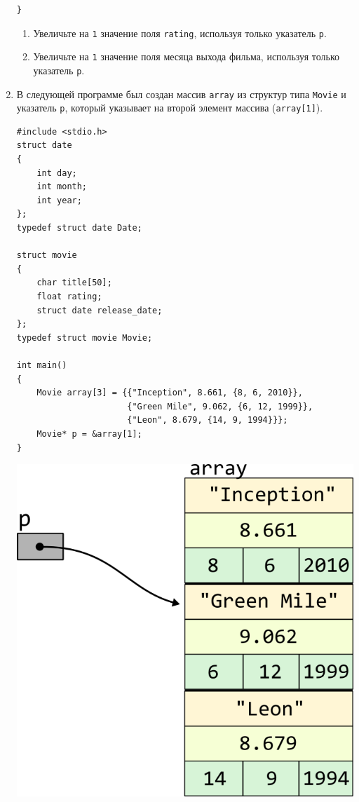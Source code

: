 \documentclass[10pt]{article}
\begin{document}
\begin{enumerate}
\begin{lstlisting}
}
\end{lstlisting}
\begin{enumerate}
\item Увеличьте на \texttt{1} значение поля \texttt{rating}, используя только указатель \texttt{p}.
\item Увеличьте на \texttt{1} значение поля месяца выхода фильма, используя только указатель \texttt{p}.
\end{enumerate}



\item В следующей программе был создан массив \texttt{array} из структур типа \texttt{Movie} и указатель \texttt{p}, который указывает на второй элемент массива (\texttt{array[1]}).
\begin{lstlisting}
#include <stdio.h>
struct date 
{
    int day;
    int month;
    int year;
};
typedef struct date Date;

struct movie 
{
    char title[50];
    float rating;
    struct date release_date;
};
typedef struct movie Movie;

int main() 
{
    Movie array[3] = {{"Inception", 8.661, {8, 6, 2010}}, 
                      {"Green Mile", 9.062, {6, 12, 1999}}, 
                      {"Leon", 8.679, {14, 9, 1994}}};
    Movie* p = &array[1];
}
\end{lstlisting}

\vspace{-55ex}
\begin{center}
\quad\quad\quad\quad\quad\quad\quad\quad\quad\quad\quad\quad\quad\quad\quad\quad\quad\quad\quad\quad\quad\quad\quad
\includegraphics[scale=1]{../images/pointer_schemes/pointer_to_array_of_struct_movie.png}
\end{center}


\end{enumerate}
\end{document}
